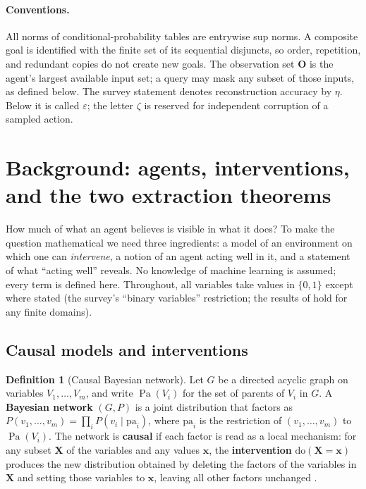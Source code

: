 \documentclass[11pt]{amsart}
\theoremstyle{plain}
\theoremstyle{definition}
\newtheorem{definition}[theorem]{Definition}
\DeclareMathOperator{\Pa}{Pa}
\newcommand{\bO}{\mathbf{O}}
\begin{document}
\paragraph{Conventions.}
All norms of conditional-probability tables are entrywise sup norms. A composite goal is identified with the finite set of its sequential disjuncts, so order, repetition, and redundant copies do not create new goals. The observation set $\bO$ is the agent's largest available input set; a query may mask any subset of those inputs, as defined below.
The survey statement denotes reconstruction accuracy by $\eta$. Below it is called $\varepsilon$; the letter $\zeta$ is reserved for independent corruption of a sampled action.

\section{Background: agents, interventions, and the two extraction theorems}\label{sec:background}

How much of what an agent believes is visible in what it does? To make the question mathematical we need three ingredients: a model of an environment on which one can \emph{intervene}, a notion of an agent acting well in it, and a statement of what ``acting well'' reveals. No knowledge of machine learning is assumed; every term is defined here. Throughout, all variables take values in $\{0,1\}$ except where stated (the survey's ``binary variables'' restriction; the results of \cite{richens2024} hold for any finite domains).

\subsection{Causal models and interventions}\label{subsec:causal}

\begin{definition}[Causal Bayesian network]\label{def:cbn}
Let $G$ be a directed acyclic graph on variables $V_1,\dots,V_m$, and write $\Pa(V_i)$ for the set of parents of $V_i$ in $G$. A \textbf{Bayesian network} $(G,P)$ is a joint distribution that factors as $P(v_1,\dots,v_m)=\prod_i P(v_i\mid \mathrm{pa}_i)$, where $\mathrm{pa}_i$ is the restriction of $(v_1,\dots,v_m)$ to $\Pa(V_i)$. The network is \textbf{causal} if each factor is read as a local mechanism: for any subset $\mathbf{X}$ of the variables and any values $\mathbf{x}$, the \textbf{intervention} $\mathrm{do}(\mathbf{X}=\mathbf{x})$ produces the new distribution obtained by deleting the factors of the variables in $\mathbf{X}$ and setting those variables to $\mathbf{x}$, leaving all other factors unchanged \cite{pearl2009}.
\end{definition}
\end{document}
